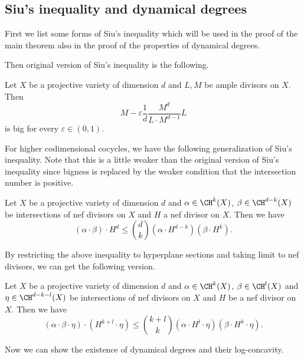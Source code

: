   

\subsection{Siu's inequality and dynamical degrees}

  First we list some forms of Siu's inequality which will be used in the proof of the main theorem also in the proof of the properties of dynamical degrees.

  Then original version of Siu's inequality is the following.
  \begin{theorem}\label{thm:Siu_inequality}
    Let $X$ be a projective variety of dimension $d$ and $L,M$ be ample divisors on $X$.
    Then 
    \[ M - \varepsilon \frac{1}{d} \frac{M^d}{L \cdot M^{d-1}} L \]
    is big for every $\varepsilon \in (0,1)$. 
  \end{theorem}

  For higher codimensional cocycles, we have the following generalization of Siu's inequality.
  Note that this is a little weaker than the original version of Siu's inequality since bigness is replaced by the weaker condition that the intersection number is positive.

  \begin{theorem}\label{thm:generalized_Siu_inequality}
    Let $X$ be a projective variety of dimension $d$ and $\alpha \in \CH^k(X)$, $\beta \in \CH^{d-k}(X)$ be intersections of nef divisors on $X$ and $H$ a nef divisor on $X$.
    Then we have 
    \[ (\alpha \cdot \beta) \cdot H^{d} \leq \binom{d}{k} (\alpha \cdot H^{d-k}) (\beta \cdot H^{k}). \]
  \end{theorem}

  By restricting the above inequality to hyperplane sections and taking limit to nef divisors, we can get the following version.

  \begin{corollary}
    Let $X$ be a projective variety of dimension $d$ and $\alpha \in \CH^k(X)$, $\beta \in \CH^l(X)$ and 
    $\eta \in \CH^{d-k-l}(X)$ be intersections of nef divisors on $X$ and $H$ be a nef divisor on $X$.
    Then we have
    \[ (\alpha \cdot \beta \cdot \eta) \cdot (H^{k+l} \cdot \eta) \leq \binom{k+l}{k} (\alpha \cdot H^{l} \cdot \eta) (\beta \cdot H^{k} \cdot \eta). \]
  \end{corollary}

  Now we can show the existence of dynamical degrees and their log-concavity.

